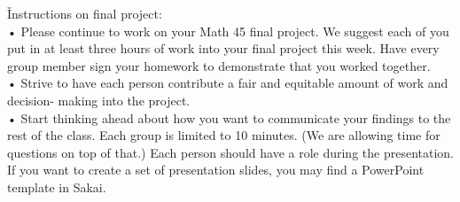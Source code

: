 \newpage
\hfill
\newpage

\begin{problem}[6]
\v{Instructions on final project:}\\
• Please continue to work on your Math 45 final project. We suggest each of you put in at least three hours of work into your final project this week. Have every group member sign your homework to demonstrate that you worked together.\\
• Strive to have each person contribute a fair and equitable amount of work and decision- making into the project.\\
• Start thinking ahead about how you want to communicate your findings to the rest of the class. Each group is limited to 10 minutes. (We are allowing time for questions on top of that.) Each person should have a role during the presentation. If you want to create a set of presentation slides, you may find a PowerPoint template in Sakai.
\end{problem}


